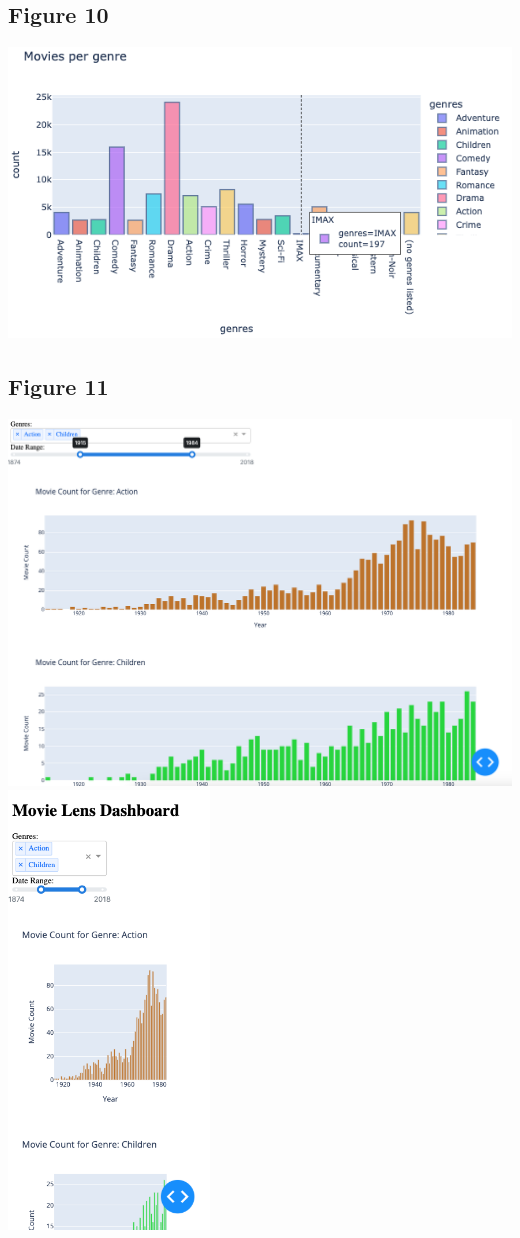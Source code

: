 \documentclass{article}
\begin{document}
\subsection{Figure 10}
\includegraphics[width=1\textwidth]{img/fitts_hover.png}

\subsection{Figure 11}
\includegraphics[width=1\textwidth]{img/dashboard_updated.png}\\
\includegraphics[width=0.4\textwidth]{img/dashboard_mobile.png}
  
\end{document}
